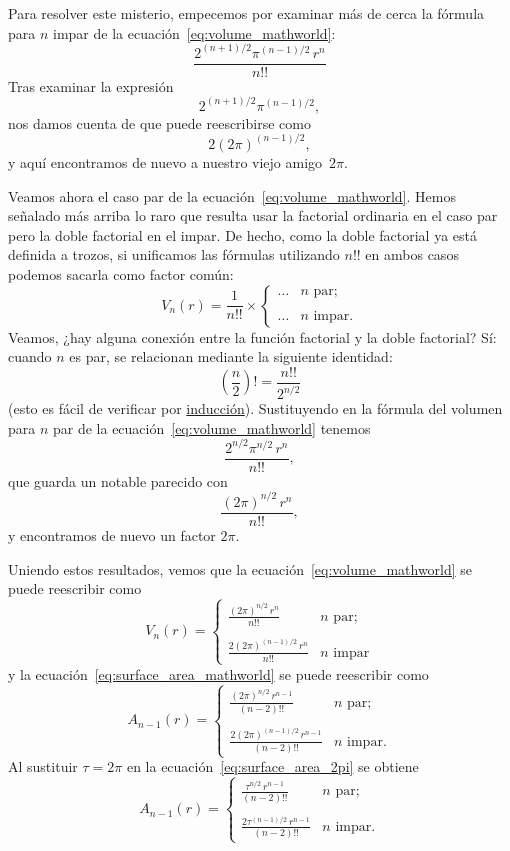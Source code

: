 Para resolver este misterio, empecemos por examinar más de cerca la fórmula para $n$ impar de la ecuación~\eqref{eq:volume_mathworld}:
\[ \frac{2^{(n+1)/2}\pi^{(n-1)/2}\,r^n}{n!!} \]
Tras examinar la expresión
\[ 2^{(n+1)/2}\pi^{(n-1)/2}, \]
nos damos cuenta de que puede reescribirse como
\[ 2(2\pi)^{(n-1)/2}, \]
y aquí encontramos de nuevo a nuestro viejo amigo~$2\pi$.

Veamos ahora el caso par de la ecuación~\eqref{eq:volume_mathworld}. Hemos señalado más arriba lo raro que resulta usar la factorial ordinaria en el caso par pero la doble factorial en el impar. De hecho, como la doble factorial ya está definida a trozos, si unificamos las fórmulas utilizando $n!!$ en ambos casos podemos sacarla como factor común:
\[
V_n(r) = \frac{1}{n!!}\times \begin{cases}
\ldots & n \text{ par}; \\ \\
 \ldots & n \text{ impar}.
 \end{cases}
\]
Veamos, ¿hay alguna conexión entre la función factorial y la doble factorial? Sí: cuando $n$ es par, se relacionan mediante la siguiente identidad:
\[ \left(\frac{n}{2}\right)! = \frac{n!!}{2^{n/2}} \]
(esto es fácil de verificar por \href{https://es.wikipedia.org/wiki/Inducción_matemática}{inducción}). Sustituyendo en la fórmula del volumen para $n$ par de la ecuación~\eqref{eq:volume_mathworld} tenemos
\[ \frac{2^{n/2}\pi^{n/2}\,r^n}{n!!}, \]
que guarda un notable parecido con
\[ \frac{(2\pi)^{n/2}\,r^n}{n!!}, \]
y encontramos de nuevo un factor $2\pi$.

Uniendo estos resultados, vemos que la ecuación~\eqref{eq:volume_mathworld} se puede reescribir como
\begin{equation}
\label{eq:volume_2pi}
V_n(r) = \begin{cases}
 \displaystyle \frac{(2\pi)^{n/2}\,r^n}{n!!} & n \text{ par}; \\ \\
 \displaystyle \frac{2(2\pi)^{(n-1)/2}\,r^n}{n!!} & n \text{ impar}
 \end{cases}
\end{equation}
y la ecuación~\eqref{eq:surface_area_mathworld} se puede reescribir como
\begin{equation}
\label{eq:surface_area_2pi}
A_{n-1}(r) = \begin{cases}
\displaystyle \frac{(2\pi)^{n/2}\,r^{n-1}}{(n-2)!!} & n \text{ par}; \\ \\
\displaystyle \frac{2(2\pi)^{(n-1)/2}\,r^{n-1}}{(n-2)!!} & n \text{ impar}.
\end{cases}
\end{equation}
Al sustituir $\tau=2\pi$ en la ecuación~\eqref{eq:surface_area_2pi} se obtiene
\[
A_{n-1}(r) = \begin{cases}
\displaystyle \frac{\tau^{n/2}\,r^{n-1}}{(n-2)!!} & n \text{ par}; \\ \\
\displaystyle \frac{2\tau^{(n-1)/2}\,r^{n-1}}{(n-2)!!} & n \text{ impar}.
\end{cases} \]

